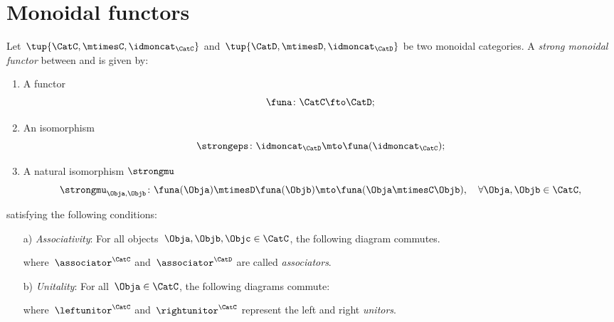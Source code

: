 

\section{Monoidal functors}
\label{sec:monoidal-functors}
\begin{ctdefinition}
  \label{def:strong-monoidal-functor}

  Let~$\tup{\CatC,\mtimesC,\idmoncat_{\CatC}}$ and~$\tup{\CatD,\mtimesD,\idmoncat_{\CatD}}$ be two monoidal categories.
  A \emph{strong monoidal functor} between \CatC and \CatD is given by:
  \begin{enumerate}
    \item A functor
    \begin{equation}
      \funa \colon \CatC \fto \CatD;
    \end{equation}
    \item An isomorphism
    \begin{equation}
      \strongeps\colon \idmoncat_{\CatD}\mto \funa(\idmoncat_{\CatC});
    \end{equation}
    \item A natural isomorphism $\strongmu$
    \begin{equation}
      \strongmu_{\Obja,\Objb}\colon \funa(\Obja)\mtimesD \funa(\Objb) \mto \funa(\Obja \mtimesC \Objb),\quad \forall \Obja,\Objb\in \CatC,
    \end{equation}
  \end{enumerate}
  satisfying the following conditions:
  \begin{enumerate}
    \item[a)] \emph{Associativity}: For all objects~$\Obja,\Objb,\Objc\in \CatC$, the following diagram commutes.
    \begin{center}
    \end{center}
    where~$\associator^\CatC$ and~$\associator^\CatD$ are called \emph{associators}.
    \item[b)] \emph{Unitality}: For all~$\Obja\in \CatC$, the following diagrams commute:
    \begin{center}
    \end{center}
    where~$\leftunitor^\CatC$ and~$\rightunitor^\CatC$ represent the left and right \emph{unitors}.
  \end{enumerate}
\end{ctdefinition}





